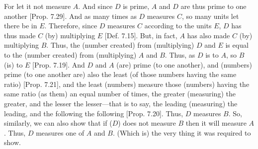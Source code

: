 \begin{Parallel}{}{}
{For let it not measure $A$. And since $D$ is prime, $A$ and $D$ are thus prime to
one another [Prop. 7.29]. 
And as many times as $D$ measures $C$, so many units let there be in $E$.
Therefore, since $D$ measures $C$ according to the units $E$, $D$ has thus
made $C$ (by) multiplying $E$ [Def. 7.15].
But, in fact, $A$ has also made $C$ (by) multiplying $B$. Thus, the
(number created) from (multiplying) $D$ and $E$ is equal to
the (number created) from (multiplying) $A$ and $B$. Thus, as $D$ is to $A$,
so $B$ (is) to $E$ [Prop. 7.19]. And
$D$ and $A$ (are) prime (to one another), and (numbers) prime (to one another
are) also the least (of those numbers having the same ratio) [Prop. 7.21], and the least (numbers) measure
those (numbers) having the same ratio (as them) an equal number of times, the
greater (measuring) the greater, and the lesser the lesser---that is to
say, the leading (measuring) the leading, and the following the following
[Prop. 7.20]. Thus, $D$ measures $B$. So,
 similarly, we can also show that if ($D$) does not measure $B$ then it will measure
 $A$. Thus, $D$ measures one of $A$ and $B$. (Which is) the very thing it was required to show.}
\end{Parallel}

